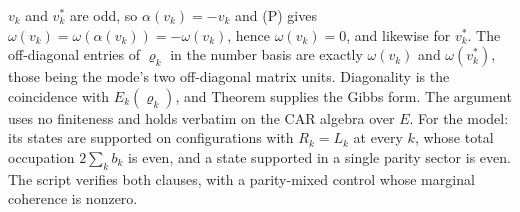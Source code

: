 $v_k$ and $v_k^{*}$ are odd, so $\alpha(v_k) = -v_k$ and (P) gives $\omega(v_k) = \omega(\alpha(v_k)) = -\omega(v_k)$, hence $\omega(v_k) = 0$, and likewise for $v_k^{*}$. The off-diagonal entries of $\varrho_k$ in the number basis are exactly $\omega(v_k)$ and $\omega(v_k^{*})$, those being the mode's two off-diagonal matrix units. Diagonality is the coincidence with $E_k(\varrho_k)$, and Theorem  supplies the Gibbs form. The argument uses no finiteness and holds verbatim on the CAR algebra over $E$. For the model: its states are supported on configurations with $R_k = L_k$ at every $k$, whose total occupation $2\sum_k b_k$ is even, and a state supported in a single parity sector is even. The script verifies both clauses, with a parity-mixed control whose marginal coherence is nonzero.
